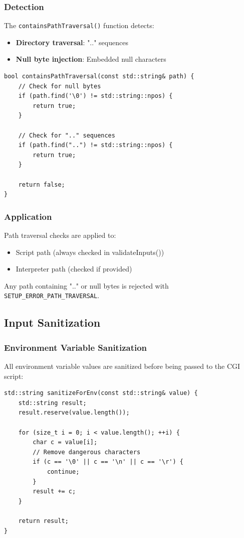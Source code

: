 \documentclass[11pt,a4paper]{article}
\begin{document}
\subsubsection{Detection}

The \texttt{containsPathTraversal()} function detects:

\begin{itemize}
    \item \textbf{Directory traversal}: ".." sequences
    \item \textbf{Null byte injection}: Embedded null characters
\end{itemize}

\begin{lstlisting}[caption=Path Traversal Detection]
bool containsPathTraversal(const std::string& path) {
    // Check for null bytes
    if (path.find('\0') != std::string::npos) {
        return true;
    }
    
    // Check for ".." sequences
    if (path.find("..") != std::string::npos) {
        return true;
    }
    
    return false;
}
\end{lstlisting}

\subsubsection{Application}

Path traversal checks are applied to:
\begin{itemize}
    \item Script path (always checked in validateInputs())
    \item Interpreter path (checked if provided)
\end{itemize}

Any path containing ".." or null bytes is rejected with \texttt{SETUP\_ERROR\_PATH\_TRAVERSAL}.

\subsection{Input Sanitization}

\subsubsection{Environment Variable Sanitization}

All environment variable values are sanitized before being passed to the CGI script:

\begin{lstlisting}[caption=Environment Sanitization]
std::string sanitizeForEnv(const std::string& value) {
    std::string result;
    result.reserve(value.length());
    
    for (size_t i = 0; i < value.length(); ++i) {
        char c = value[i];
        // Remove dangerous characters
        if (c == '\0' || c == '\n' || c == '\r') {
            continue;
        }
        result += c;
    }
    
    return result;
}
\end{lstlisting}
\end{document}

